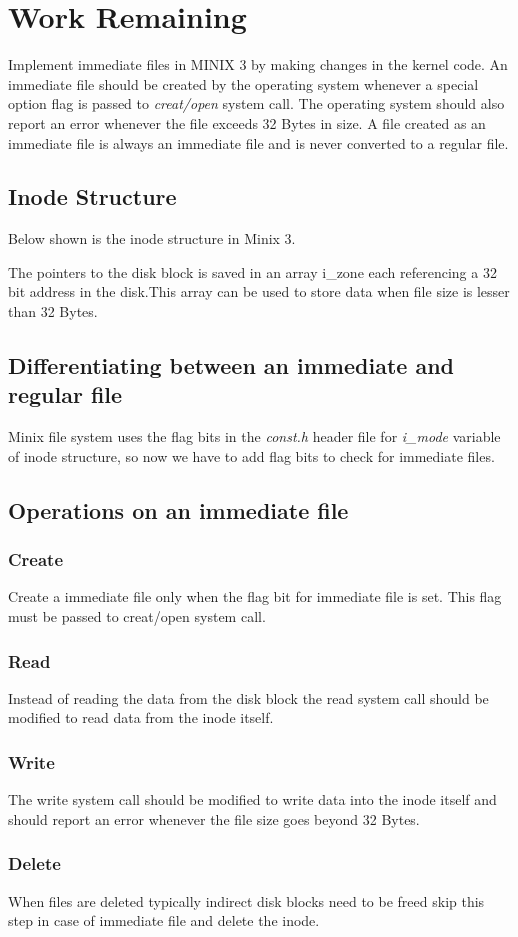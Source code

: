\chapter{Work Remaining}

Implement immediate files in MINIX 3 by making changes in the kernel code. An immediate file should be created by the operating system whenever a special option flag is passed to {\em creat/open } system call. The operating system should also report an error whenever the file exceeds 32 Bytes in size. A file created as an immediate file is always an immediate file and is never converted to a regular file.

\section{Inode Structure}
Below shown is the inode structure in Minix 3.



The pointers to the disk block is saved in an array i\_zone each referencing a 32 bit address in the disk.This array can be used to store data when file size is lesser than 32 Bytes. 

\section{Differentiating between an immediate and regular file}

Minix file system uses the flag bits in the {\em const.h} header file for { \em i\_mode} variable of inode structure, so now we have to add flag bits to check for immediate files.

\section{Operations on an immediate file}
\subsection{Create}
Create a immediate file only when the flag bit for immediate file is set. This flag must be passed to creat/open system call.
\subsection{Read}
Instead of reading the data from the disk block the read system call should be modified to read data from the inode itself.
\subsection{Write}
The write system call should be modified to write data into the inode itself and should report an error whenever the file size goes beyond 32 Bytes.
\subsection{Delete}
When files are deleted typically indirect disk blocks need to be freed skip this step in case of immediate file and delete the inode.
